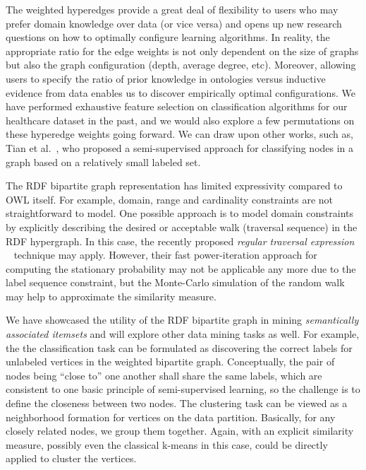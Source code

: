 The weighted hyperedges provide a great deal of flexibility to users who may prefer domain knowledge over data (or vice versa) and opens up new research questions on how to optimally configure learning algorithms. In reality, the appropriate ratio for the edge weights is not only dependent on the size of graphs but also the graph configuration (depth, average degree, etc). Moreover, allowing users to specify the ratio of prior knowledge in ontologies versus inductive evidence from data enables us to discover empirically optimal configurations. We have performed exhaustive feature selection on classification algorithms for our healthcare dataset in the past, and we would also explore a few permutations on these hyperedge weights going forward. We can draw upon other works, such as, Tian et al.~\cite{Tian2009AHyper}, who proposed a semi-supervised approach for classifying nodes in a graph based on a relatively small labeled set.

The RDF bipartite graph representation has limited expressivity compared to OWL itself. For example, domain, range and cardinality constraints are not straightforward to model.  One possible approach is to model domain constraints by explicitly describing the desired or acceptable walk (traversal sequence) in the RDF hypergraph. In this case, the recently proposed \emph{regular traversal expression} ~\cite{Marko10} technique may apply. However, their fast power-iteration approach for computing the stationary probability may not be applicable any more due to the label sequence constraint, but the Monte-Carlo simulation of the random walk may help to approximate the similarity measure.

We have showcased the utility of the RDF bipartite graph in mining \emph{semantically associated itemsets} and will explore other data mining tasks as well. For example, the the classification task can be formulated as discovering the correct labels for unlabeled vertices in the weighted bipartite graph. Conceptually, the pair of nodes being ``close to'' one another shall share the same labels, which are consistent to one basic principle of semi-supervised learning, so the challenge is to define the closeness between two nodes. The clustering task can be viewed as a neighborhood formation for vertices on the data partition. Basically, for any closely related nodes, we group them together. Again, with an explicit similarity measure, possibly even the classical k-means in this case, could be directly applied to cluster the vertices. 